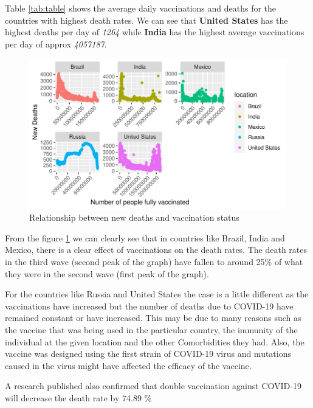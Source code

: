 \documentclass[11pt,a4paper,]{article}
\begin{document}
Table \ref{tab:table} shows the average daily vaccinations and deaths for the countries with highest death rates. We can see that \textbf{United States} has the highest deaths per day of \emph{1264} while \textbf{India} has the highest average vaccinations per day of approx \emph{4057187}.

\begin{figure}

{\centering \includegraphics{report_files/figure-latex/graph-1} 

}

\caption{Relationship between new deaths and vaccination status }\label{fig:graph}
\end{figure}

From the figure \ref{fig:graph} we can clearly see that in countries like Brazil, India and Mexico, there is a clear effect of vaccinations on the death rates. The death rates in the third wave (second peak of the graph) have fallen to around 25\% of what they were in the second wave (first peak of the graph).

\clearpage

For the countries like Russia and United States the case is a little different as the vaccinations have increased but the number of deaths due to COVID-19 have remained constant or have increased. This may be due to many reasons such as the vaccine that was being used in the particular country, the immunity of the individual at the given location and the other Comorbidities they had. Also, the vaccine was designed using the first strain of COVID-19 virus and mutations caused in the virus might have affected the efficacy of the vaccine.

A research published \textcite{paper} also confirmed that double vaccination against COVID-19 will decrease the death rate by 74.89 \%
\end{document}
